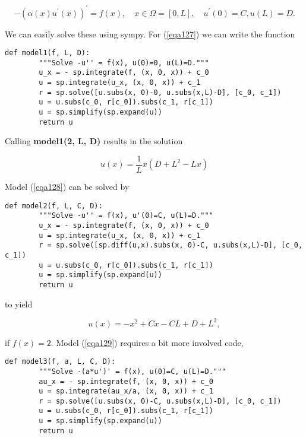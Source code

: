 \documentclass[../main.tex]{subfiles}
\begin{document}
	\begin{equation}
		\label{eqa129}
		-\left(\alpha(x) u^{\prime}(x)\right)^{\prime}=f(x), \quad x \in \Omega=[0, L], \quad u^{\prime}(0)=C, u(L)=D .
	\end{equation}

	We can easily solve these using sympy. For (\ref{eqa127}) we can write the function
	
	\begin{lstlisting}[numbers=none]
		def model1(f, L, D):
		"""Solve -u'' = f(x), u(0)=0, u(L)=D."""
		u_x = - sp.integrate(f, (x, 0, x)) + c_0
		u = sp.integrate(u_x, (x, 0, x)) + c_1
		r = sp.solve([u.subs(x, 0)-0, u.subs(x,L)-D], [c_0, c_1])
		u = u.subs(c_0, r[c_0]).subs(c_1, r[c_1])
		u = sp.simplify(sp.expand(u))
		return u
	\end{lstlisting}
	
	\noindent Calling \textbf{model1(2, L, D)} results in the solution
	
	\begin{equation}
		\label{eqa130}
		u(x)=\frac{1}{L} x\left(D+L^{2}-L x\right)
	\end{equation}

	\noindent Model (\ref{eqa128}) can be solved by
	
	\begin{lstlisting}[numbers=none]
		def model2(f, L, C, D):
		"""Solve -u'' = f(x), u'(0)=C, u(L)=D."""
		u_x = - sp.integrate(f, (x, 0, x)) + c_0
		u = sp.integrate(u_x, (x, 0, x)) + c_1
		r = sp.solve([sp.diff(u,x).subs(x, 0)-C, u.subs(x,L)-D], [c_0, c_1])
		u = u.subs(c_0, r[c_0]).subs(c_1, r[c_1])
		u = sp.simplify(sp.expand(u))
		return u
	\end{lstlisting}
	
	\noindent to yield
	
	\begin{equation}
		\label{eqa131}
		u(x)=-x^{2}+C x-C L+D+L^{2},
	\end{equation}

	\noindent if $f(x)=2$. Model (\ref{eqa129}) requires a bit more involved code,
	
	
	\begin{lstlisting}[numbers=none]
		def model3(f, a, L, C, D):
		"""Solve -(a*u')' = f(x), u(0)=C, u(L)=D."""
		au_x = - sp.integrate(f, (x, 0, x)) + c_0
		u = sp.integrate(au_x/a, (x, 0, x)) + c_1
		r = sp.solve([u.subs(x, 0)-C, u.subs(x,L)-D], [c_0, c_1])
		u = u.subs(c_0, r[c_0]).subs(c_1, r[c_1])
		u = sp.simplify(sp.expand(u))
		return u
	\end{lstlisting}
	
\end{document}

